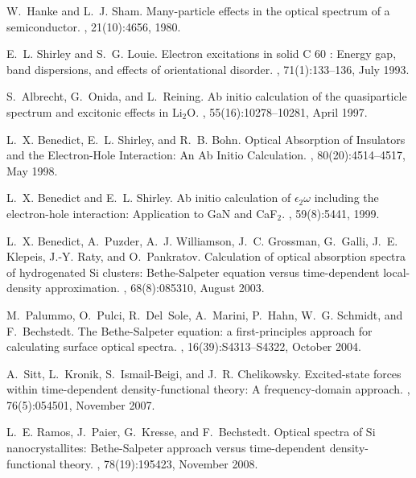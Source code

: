 \documentclass[aps,prb,10pt,showpacs,superscriptaddress,twocolumn,notitlepage]{revtex4-1}
\begin{document}
\begin{thebibliography}{10}
W.~Hanke and L.~J. Sham.
\newblock Many-particle effects in the optical spectrum of a semiconductor.
, 21(10):4656, 1980.

E.~L. Shirley and S.~G. Louie.
\newblock Electron excitations in solid {C} 60 : {Energy} gap, band
  dispersions, and effects of orientational disorder.
, 71(1):133--136, July 1993.

S.~Albrecht, G.~Onida, and L.~Reining.
\newblock Ab initio calculation of the quasiparticle spectrum and excitonic
  effects in {Li$_{2}$O}.
, 55(16):10278--10281, April 1997.

L.~X. Benedict, E.~L. Shirley, and R.~B. Bohn.
\newblock Optical {Absorption} of {Insulators} and the {Electron}-{Hole}
  {Interaction}: {An} {Ab} {Initio} {Calculation}.
, 80(20):4514--4517, May 1998.

L.~X. Benedict and E.~L. Shirley.
\newblock Ab initio calculation of {$\epsilon_{2}\omega$} including the
  electron-hole interaction: {Application} to {GaN} and {CaF$_{2}$}.
, 59(8):5441, 1999.

L.~X. Benedict, A.~Puzder, A.~J. Williamson, J.~C. Grossman, G.~Galli, J.~E.
  Klepeis, J.-Y. Raty, and O.~Pankratov.
\newblock Calculation of optical absorption spectra of hydrogenated {Si}
  clusters: {Bethe}-{Salpeter} equation versus time-dependent local-density
  approximation.
, 68(8):085310, August 2003.

M.~Palummo, O.~Pulci, R.~Del~Sole, A.~Marini, P.~Hahn, W.~G. Schmidt, and
  F.~Bechstedt.
\newblock The {Bethe}-{Salpeter} equation: a first-principles approach for
  calculating surface optical spectra.
, 16(39):S4313--S4322, October 2004.

A.~Sitt, L.~Kronik, S.~Ismail-Beigi, and J.~R. Chelikowsky.
\newblock Excited-state forces within time-dependent density-functional theory:
  {A} frequency-domain approach.
, 76(5):054501, November 2007.

L.~E. Ramos, J.~Paier, G.~Kresse, and F.~Bechstedt.
\newblock Optical spectra of {Si} nanocrystallites: {Bethe}-{Salpeter} approach
  versus time-dependent density-functional theory.
, 78(19):195423, November 2008.


\end{thebibliography}
\end{document}
